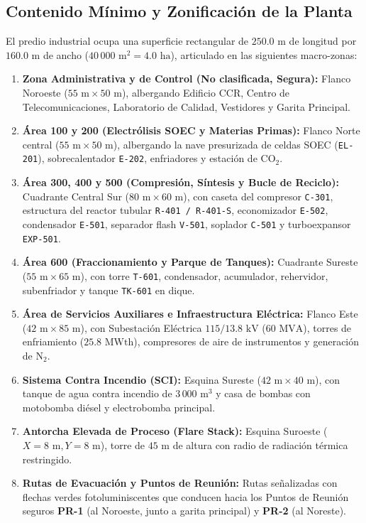 \documentclass[10pt,letterpaper]{article}
\begin{document}
\subsection{Contenido Mínimo y Zonificación de la Planta}
El predio industrial ocupa una superficie rectangular de $250.0\text{ m}$ de longitud por $160.0\text{ m}$ de ancho ($40\,000\text{ m}^2 = 4.0\text{ ha}$), articulado en las siguientes macro-zonas:
\begin{enumerate}
    \item \textbf{Zona Administrativa y de Control (No clasificada, Segura):} Flanco Noroeste ($55\text{ m} \times 50\text{ m}$), albergando Edificio CCR, Centro de Telecomunicaciones, Laboratorio de Calidad, Vestidores y Garita Principal.
    \item \textbf{Área 100 y 200 (Electrólisis SOEC y Materias Primas):} Flanco Norte central ($55\text{ m} \times 50\text{ m}$), albergando la nave presurizada de celdas SOEC (\texttt{EL-201}), sobrecalentador \texttt{E-202}, enfriadores y estación de $\text{CO}_2$.
    \item \textbf{Área 300, 400 y 500 (Compresión, Síntesis y Bucle de Reciclo):} Cuadrante Central Sur ($80\text{ m} \times 60\text{ m}$), con caseta del compresor \texttt{C-301}, estructura del reactor tubular \texttt{R-401 / R-401-S}, economizador \texttt{E-502}, condensador \texttt{E-501}, separador flash \texttt{V-501}, soplador \texttt{C-501} y turboexpansor \texttt{EXP-501}.
    \item \textbf{Área 600 (Fraccionamiento y Parque de Tanques):} Cuadrante Sureste ($55\text{ m} \times 65\text{ m}$), con torre \texttt{T-601}, condensador, acumulador, rehervidor, subenfriador y tanque \texttt{TK-601} en dique.
    \item \textbf{Área de Servicios Auxiliares e Infraestructura Eléctrica:} Flanco Este ($42\text{ m} \times 85\text{ m}$), con Subestación Eléctrica $115/13.8\text{ kV}$ ($60\text{ MVA}$), torres de enfriamiento ($25.8\text{ MWth}$), compresores de aire de instrumentos y generación de $\text{N}_2$.
    \item \textbf{Sistema Contra Incendio (SCI):} Esquina Sureste ($42\text{ m} \times 40\text{ m}$), con tanque de agua contra incendio de $3\,000\text{ m}^3$ y casa de bombas con motobomba diésel y electrobomba principal.
    \item \textbf{Antorcha Elevada de Proceso (Flare Stack):} Esquina Suroeste ($X=8\text{ m}, Y=8\text{ m}$), torre de $45\text{ m}$ de altura con radio de radiación térmica restringido.
    \item \textbf{Rutas de Evacuación y Puntos de Reunión:} Rutas señalizadas con flechas verdes fotoluminiscentes que conducen hacia los Puntos de Reunión seguros \textbf{PR-1} (al Noroeste, junto a garita principal) y \textbf{PR-2} (al Noreste).
\end{enumerate}
\end{document}
